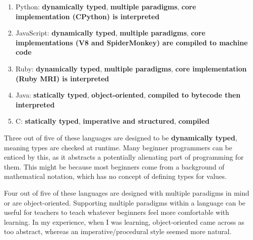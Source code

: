 \begin{enumerate}
    \item Python: \textbf{dynamically typed}, \textbf{multiple paradigms}, \textbf{core implementation (CPython) is interpreted}\textsuperscript{\cite{5_easiest_and_hardest_programming_languages_to_learn}}\textsuperscript{\cite{6_easiest_programming_languages_to_learn}}\textsuperscript{\cite{deery_2021}}
    \item JavaScript: \textbf{dynamically typed}, \textbf{multiple paradigms}, \textbf{core implementations (V8 and SpiderMonkey) are compiled to machine code}\textsuperscript{\cite{5_easiest_and_hardest_programming_languages_to_learn}}\textsuperscript{\cite{6_easiest_programming_languages_to_learn}}\textsuperscript{\cite{deery_2021}}
    \item Ruby: \textbf{dynamically typed}, \textbf{multiple paradigms}, \textbf{core implementation (Ruby MRI) is interpreted}\textsuperscript{\cite{6_easiest_programming_languages_to_learn}}\textsuperscript{\cite{deery_2021}}
    \item Java: \textbf{statically typed}, \textbf{object-oriented}, \textbf{compiled to bytecode then interpreted}\textsuperscript{\cite{5_easiest_and_hardest_programming_languages_to_learn}}\textsuperscript{\cite{6_easiest_programming_languages_to_learn}}
    \item C: \textbf{statically typed}, \textbf{imperative and structured}, \textbf{compiled}\textsuperscript{\cite{5_easiest_and_hardest_programming_languages_to_learn}}\textsuperscript{\cite{6_easiest_programming_languages_to_learn}}
\end{enumerate}

Three out of five of these languages are designed to be \textbf{dynamically typed}, meaning types are checked at runtime. Many beginner programmers can be enticed by this, as it abstracts a potentially alienating part of programming for them. This might be because most beginners come from a background of mathematical notation, which has no concept of defining types for values.

Four out of five of these languages are designed with multiple paradigms in mind or are object-oriented. Supporting multiple paradigms within a language can be useful for teachers to teach whatever beginners feel more comfortable with learning. In my experience, when I was learning, object-oriented came across as too abstract, whereas an imperative/procedural style seemed more natural.

